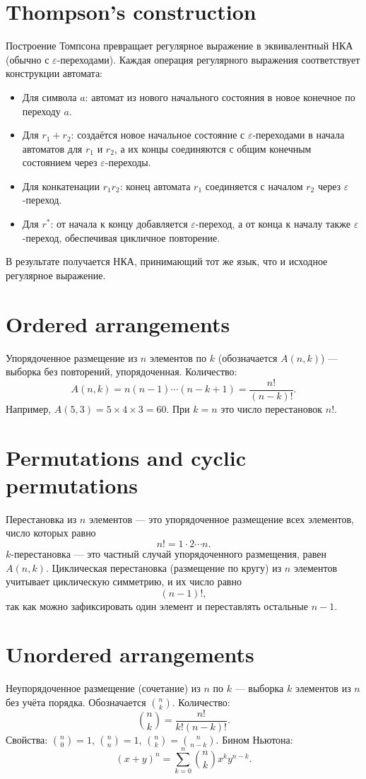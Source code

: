 \documentclass{article}
\begin{document}
	\section{Thompson’s construction}
	Построение Томпсона превращает регулярное выражение в эквивалентный НКА (обычно с $\varepsilon$-переходами). Каждая операция регулярного выражения соответствует конструкции автомата:
	\begin{itemize}
		\item Для символа $a$: автомат из нового начального состояния в новое конечное по переходу $a$.
		\item Для $r_1 + r_2$: создаётся новое начальное состояние с $\varepsilon$-переходами в начала автоматов для $r_1$ и $r_2$, а их концы соединяются с общим конечным состоянием через $\varepsilon$-переходы.
		\item Для конкатенации $r_1 r_2$: конец автомата $r_1$ соединяется с началом $r_2$ через $\varepsilon$-переход.
		\item Для $r^*$: от начала к концу добавляется $\varepsilon$-переход, а от конца к началу также $\varepsilon$-переход, обеспечивая цикличное повторение.
	\end{itemize}
	В результате получается НКА, принимающий тот же язык, что и исходное регулярное выражение.
	
	\section{Ordered arrangements}
	Упорядоченное размещение из $n$ элементов по $k$ (обозначается $A(n,k)$) --- выборка без повторений, упорядоченная. Количество:
	\[
	A(n,k) = n(n-1)\cdots(n-k+1) = \frac{n!}{(n-k)!}.
	\]
	Например, $A(5,3) = 5\times4\times3 = 60$. При $k=n$ это число перестановок $n!$.
	
	\section{Permutations and cyclic permutations}
	Перестановка из $n$ элементов --- это упорядоченное размещение всех элементов, число которых равно
	\[
	n! = 1\cdot2\cdots n.
	\]
	$k$-перестановка --- это частный случай упорядоченного размещения, равен $A(n,k)$. Циклическая перестановка (размещение по кругу) из $n$ элементов учитывает циклическую симметрию, и их число равно
	\[
	(n-1)!,
	\]
	так как можно зафиксировать один элемент и переставлять остальные $n-1$.
	
	\section{Unordered arrangements}
	Неупорядоченное размещение (сочетание) из $n$ по $k$ --- выборка $k$ элементов из $n$ без учёта порядка. Обозначается $\displaystyle \binom{n}{k}$. Количество:
	\[
	\binom{n}{k} = \frac{n!}{k!(n-k)!}.
	\]
	Свойства: $\binom{n}{0}=1$, $\binom{n}{n}=1$, $\binom{n}{k} = \binom{n}{n-k}$. Бином Ньютона:
	\[
	(x+y)^n = \sum_{k=0}^n \binom{n}{k} x^k y^{n-k}.
	\]
	
\end{document}
